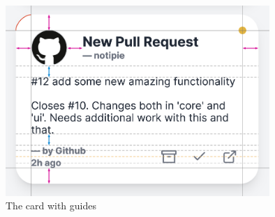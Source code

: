\begin{figure}[p]
      \centering
      \includegraphics[width=10cm,keepaspectratio]{img/card_guides.png}
      \caption{The card with guides}
      \label{fig:card-with-guides}
\end{figure}
